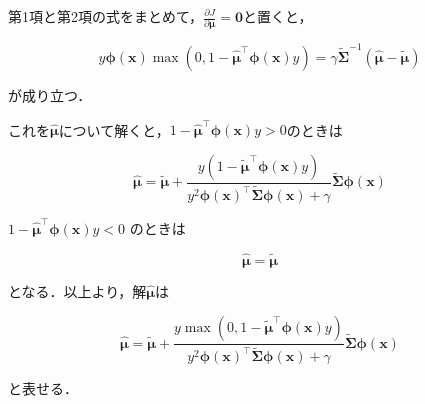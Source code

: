 \documentclass[dvipdfmx]{jsarticle}
\newcommand{\bmu}{{\bm{\mu}}}
\newcommand{\tbmu}{\tilde{\bm{\mu}}}
\newcommand{\hbmu}{\hat{\bm{\mu}}}
\newcommand{\hbmut}{\hat{\bm{\mu}}^\top}
\newcommand{\tbmut}{\tilde{\bm{\mu}}^\top}
\newcommand{\sig}{\tilde{\bm{\Sigma}}}
\newcommand{\siginv}{\tilde{\bm{\Sigma}}^{-1}}
\newcommand{\bphi}{\bm{\phi}(\bm{x})}
\newcommand{\bphit}{\bm{\phi}(\bm{x})^\top}
\begin{document}
\newpage

第1項と第2項の式をまとめて，$\displaystyle\frac{\partial J}{\partial \bmu} = \bm{0}$と置くと，

$$
y\bphi\max\left(0, 1 - \hbmut\bphi y\right) = \gamma \siginv (\hbmu - \tbmu)
$$

が成り立つ．


これを$\hbmu$について解くと，$1-\hbmut\bphi y > 0$のときは

$$
\hbmu = \tbmu + \frac{y \left(1-\tbmut\bphi y\right)}{y^2 \bphit\sig\bphi + \gamma}\sig\bphi
$$

$1-\hbmut\bphi y < 0$ のときは

$$
\hbmu = \tbmu
$$

となる．以上より，解$\hbmu$は

$$
\hbmu = \tbmu + \frac{y \max\left(0, 1-\tbmut\bphi y\right)}{y^2 \bphit\sig\bphi + \gamma}\sig\bphi
$$

と表せる．
\end{document}
